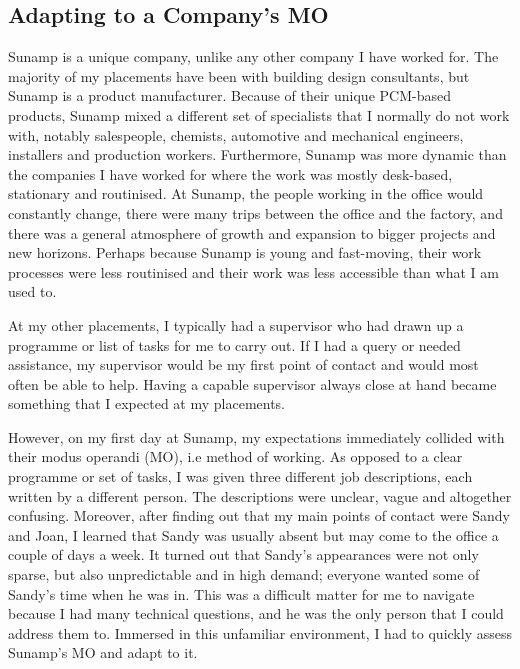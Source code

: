 
\subsection{Adapting to a Company's MO}

Sunamp is a unique company, unlike any other company I have worked for.
The majority of my placements have been with building design consultants, but Sunamp is a product manufacturer.
Because of their unique PCM-based products, Sunamp mixed a different set of specialists that I normally do not work with, notably salespeople, chemists, automotive and mechanical engineers, installers and production workers.
Furthermore, Sunamp was more dynamic than the companies I have worked for where the work was mostly desk-based, stationary and routinised.
At Sunamp, the people working in the office would constantly change, there were many trips between the office and the factory, and there was a general atmosphere of growth and expansion to bigger projects and new horizons.
Perhaps because Sunamp is young and fast-moving, their work processes were less routinised and their work was less accessible than what I am used to.

At my other placements, I typically had a supervisor who had drawn up a programme or list of tasks for me to carry out.
If I had a query or needed assistance, my supervisor would be my first point of contact and would most often be able to help.
Having a capable supervisor always close at hand became something that I expected at my placements.


However, on my first day at Sunamp, my expectations immediately collided with their modus operandi (MO), i.e method of working.
As opposed to a clear programme or set of tasks, I was given three different job descriptions, each written by a different person.
The descriptions were unclear, vague and altogether confusing.
Moreover, after finding out that my main points of contact were Sandy and Joan, I learned that Sandy was usually absent but may come to the office a couple of days a week.
It turned out that Sandy's appearances were not only sparse, but also unpredictable and in high demand; everyone wanted some of Sandy's time when he was in.
This was a difficult matter for me to navigate because I had many technical questions, and he was the only person that I could address them to.
Immersed in this unfamiliar environment, I had to quickly assess Sunamp's MO and adapt to it.

